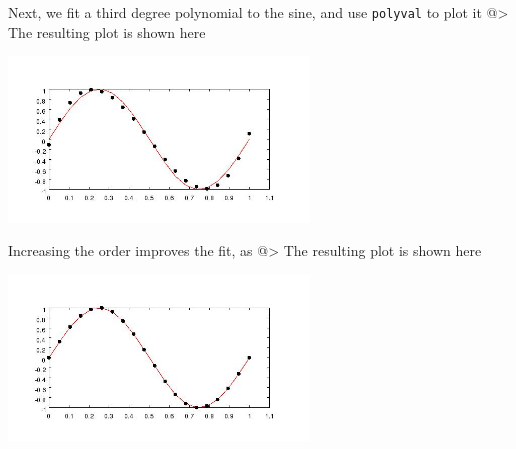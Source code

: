 Next, we fit a third degree polynomial to the sine, and use
\verb|polyval| to plot it
@>
The resulting plot is shown here


\centerline{\includegraphics[width=8cm]{polyfit2}}

Increasing the order improves the fit, as
@>
The resulting plot is shown here


\centerline{\includegraphics[width=8cm]{polyfit3}}

